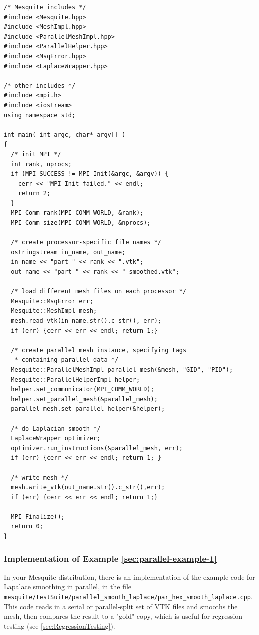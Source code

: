 \begin{verbatim}
/* Mesquite includes */
#include <Mesquite.hpp>
#include <MeshImpl.hpp>
#include <ParallelMeshImpl.hpp>
#include <ParallelHelper.hpp>
#include <MsqError.hpp>
#include <LaplaceWrapper.hpp>

/* other includes */
#include <mpi.h>
#include <iostream>
using namespace std;

int main( int argc, char* argv[] )
{
  /* init MPI */
  int rank, nprocs;
  if (MPI_SUCCESS != MPI_Init(&argc, &argv)) {
    cerr << "MPI_Init failed." << endl;
    return 2;
  }
  MPI_Comm_rank(MPI_COMM_WORLD, &rank);
  MPI_Comm_size(MPI_COMM_WORLD, &nprocs);

  /* create processor-specific file names */
  ostringstream in_name, out_name;
  in_name << "part-" << rank << ".vtk";
  out_name << "part-" << rank << "-smoothed.vtk";

  /* load different mesh files on each processor */
  Mesquite::MsqError err;
  Mesquite::MeshImpl mesh;
  mesh.read_vtk(in_name.str().c_str(), err);
  if (err) {cerr << err << endl; return 1;}

  /* create parallel mesh instance, specifying tags
   * containing parallel data */
  Mesquite::ParallelMeshImpl parallel_mesh(&mesh, "GID", "PID");
  Mesquite::ParallelHelperImpl helper;
  helper.set_communicator(MPI_COMM_WORLD);
  helper.set_parallel_mesh(&parallel_mesh);
  parallel_mesh.set_parallel_helper(&helper);

  /* do Laplacian smooth */
  LaplaceWrapper optimizer;
  optimizer.run_instructions(&parallel_mesh, err);
  if (err) {cerr << err << endl; return 1; }

  /* write mesh */
  mesh.write_vtk(out_name.str().c_str(),err);
  if (err) {cerr << err << endl; return 1;}

  MPI_Finalize();
  return 0;
}
\end{verbatim}

\subsubsection{Implementation of Example \ref{sec:parallel-example-1} }

In your Mesquite distribution, there is an implementation of the
example code for Lapalace smoothing in parallel, in the file
\texttt{mesquite/testSuite/parallel\_smooth\_laplace/par\_hex\_smooth\_laplace.cpp}.
This code reads in a serial or parallel-split set of VTK files and
smooths the mesh, then compares the result to a "gold" copy, which is
useful for regression testing (see \ref{sec:RegressionTesting}).

